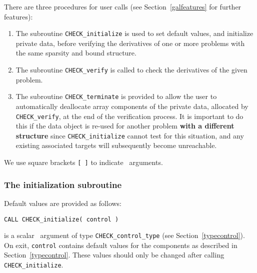 \documentclass{galahad}
\newcommand{\packagename}{CHECK}
\begin{document}




\galarguments
There are three procedures for user calls
(see Section~\ref{galfeatures} for further features): 

\begin{enumerate}
\item The subroutine 
      {\tt \packagename\_initialize} 
      is used to set default values, and initialize private data, 
      before verifying the derivatives of one or more problems with the
      same sparsity and bound structure.
\item The subroutine 
      {\tt \packagename\_verify} 
      is called to check the derivatives of the given problem.
\item The subroutine 
      {\tt \packagename\_terminate} 
      is provided to allow the user to automatically deallocate array 
       components of the private data, allocated by 
       {\tt \packagename\_verify}, 
       at the end of the verification process. 
       It is important to do this if the data object is re-used for another 
       problem {\bf with a different structure}
       since {\tt \packagename\_initialize} cannot test for this situation, 
       and any existing associated targets will subsequently become unreachable.
\end{enumerate}
We use square brackets {\tt [ ]} to indicate \optional\ arguments.


\subsubsection{The initialization subroutine}\label{subinit}
 Default values are provided as follows:
\vspace*{1mm}

\hspace{8mm}
{\tt CALL \packagename\_initialize( control )}

\vspace*{-3mm}
\begin{description}

 is a scalar \intentout\ argument of type 
{\tt \packagename\_control\_type}
(see Section~\ref{typecontrol}). 
On exit, {\tt control} contains default values for the components as
described in Section~\ref{typecontrol}.
These values should only be changed after calling 
{\tt \packagename\_initialize}.

\end{description}
\end{document}
